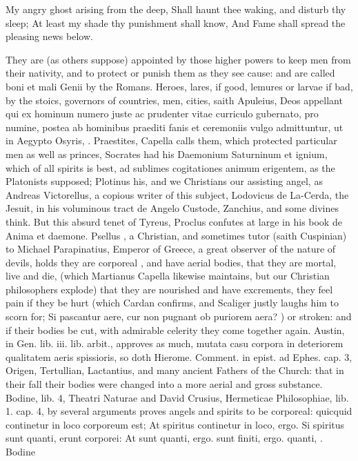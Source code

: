 {My angry ghost arising from the deep,
Shall haunt thee waking, and disturb thy sleep;
At least my shade thy punishment shall know,
And Fame shall spread the pleasing news below.

They are (as others suppose) appointed by those higher powers to keep
men from their nativity, and to protect or punish them as they see
cause: and are called boni et mali Genii by the Romans. Heroes, lares,
if good, lemures or larvae if bad, by the stoics, governors of
countries, men, cities, saith Apuleius, Deos appellant qui ex
hominum numero juste ac prudenter vitae curriculo gubernato, pro
numine, postea ab hominibus praediti fanis et ceremoniis vulgo
admittuntur, ut in Aegypto Osyris, \etc{}. Praestites, Capella calls them,
which protected particular men as well as princes, Socrates had his
Daemonium Saturninum et ignium, which of all spirits is best, ad
sublimes cogitationes animum erigentem, as the Platonists supposed;
Plotinus his, and we Christians our assisting angel, as Andreas
Victorellus, a copious writer of this subject, Lodovicus de La-Cerda,
the Jesuit, in his voluminous tract de Angelo Custode, Zanchius, and
some divines think. But this absurd tenet of Tyreus, Proclus confutes
at large in his book de Anima et daemone.
Psellus , a Christian, and sometimes tutor (saith Cuspinian) to
Michael Parapinatius, Emperor of Greece, a great observer of the nature
of devils, holds they are corporeal , and have aerial bodies,
that they are mortal, live and die, (which Martianus Capella likewise
maintains, but our Christian philosophers explode) that they are
nourished and have excrements, they feel pain if they be hurt (which
Cardan confirms, and Scaliger justly laughs him to scorn for; Si
pascantur aere, cur non pugnant ob puriorem aera? \etc{}) or stroken: and
if their bodies be cut, with admirable celerity they come together
again. Austin, in Gen. lib. iii. lib. arbit., approves as much, mutata
casu corpora in deteriorem qualitatem aeris spissioris, so doth
Hierome. Comment. in epist. ad Ephes. cap. 3, Origen, Tertullian,
Lactantius, and many ancient Fathers of the Church: that in their fall
their bodies were changed into a more aerial and gross substance.
Bodine, lib. 4, Theatri Naturae and David Crusius, Hermeticae
Philosophiae, lib. 1. cap. 4, by several arguments proves angels and
spirits to be corporeal: quicquid continetur in loco corporeum est; At
spiritus continetur in loco, ergo. Si spiritus sunt quanti, erunt
corporei: At sunt quanti, ergo. sunt finiti, ergo. quanti, \etc{}. Bodine
}

